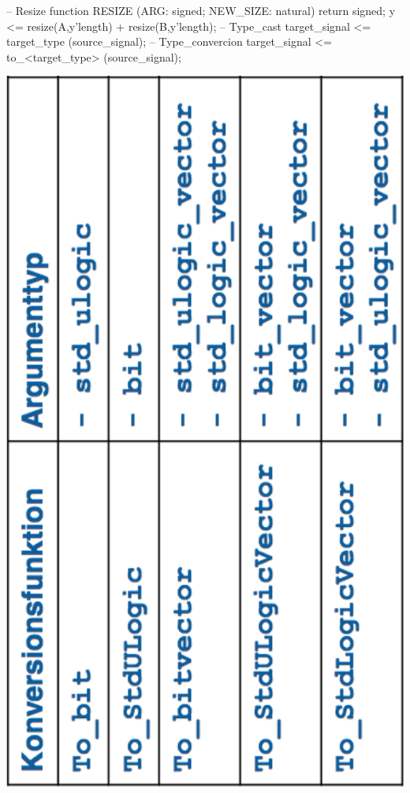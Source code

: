 \begin{minipage}{0.6\textwidth}
	\begin{minipage}{0.02\textwidth}
		\text{ } %
	\end{minipage}
	\begin{minipage}{0.72\textwidth}
		\begin{VHDL}
	-- Resize
	function RESIZE (ARG: signed; NEW_SIZE: natural)
	return signed;
	y <= resize(A,y'length) + resize(B,y'length);
	-- Type_cast
	target_signal <= target_type (source_signal);
	-- Type_convercion
	target_signal <= to_<target_type> (source_signal);	\end{VHDL}	
	\end{minipage}
	\begin{minipage}{0.02\textwidth}
		\text{ } %
	\end{minipage}
	\begin{minipage}{0.18\textwidth}
		\includegraphics[width=\textwidth]{./bilder/Konversion}
	\end{minipage}
\end{minipage}
